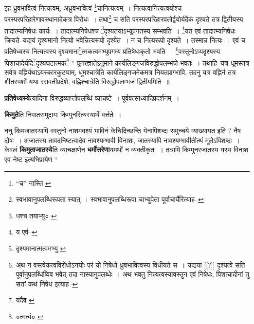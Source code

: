 \documentclass[article,12pt,a4paper]{memoir}
\begin{document}
	इह ध्रुवभावित्वं नित्यत्वम्, अध्रुवभावित्वं \footnote{“च” नास्ति \cite{dp-msB} \cite{dp-msD}}\-चानित्यत्वम् । नित्यत्वानित्यत्वयोश्च परस्परपरिहारेणावस्थानादेकत्र विरोधः । तथा\footnote{स्वभावानुपलब्धिरूपता स्यात् । स्वभावानुपलब्धिरूपा चाभ्युपेता पूर्वाचार्यैरित्याह--\cite{dp-msD-n}} च सति परस्परपरिहारवतोर्द्वयोर्यदैकं दृश्यते तत्र द्वितीयस्य तादात्म्यनिषेधः कार्यः । तादात्म्यनिषेधश्च \footnote{धश्च तयाभ्यु० \cite{dp-msA}}\-दृश्यतयाऽभ्युपगतस्य सम्भवति । \footnote{य एवं--\cite{dp-msA}}\-यत एवं तादात्म्यनिषेधः क्रियते--यद्ययं दृश्यमानो नित्यो भवेन्नित्यरूपो दृश्येत । न च नित्यरूपो दृश्यते । तस्मान्न नित्यः । एवं च प्रतिषेध्यस्य नित्यत्वस्य दृश्यमाना\footnote{दृश्यमानात्मत्वमभ्यु \cite{dp-msA} \cite{dp-edP} \cite{dp-edH} \cite{dp-edE} \cite{dp-edN}}त्मकत्वमभ्युपगम्य प्रतिषेधःकृतो भवति । \footnote{अथ न वस्त्वेकत्वविरोधोऽनयोः परं यो निषेधो ध्रुवभावित्वस्य विधीयते स । यद्यया [[?]] दृश्यत्वे सति पूर्वानुपलब्धिष्विव भवेत् तदा नास्यानुपलब्धेः । अथ भवतु नित्यत्वस्यावस्तुन एवं निषेधः, पिशाचादीनां तु सतां कथं निषेध इत्याह--\cite{dp-msD-n}}\-वस्तुनोऽप्यदृश्यस्य पिशाचादेर्यदि\footnote{यदैव \cite{dp-msB}}\-दृश्यघटात्मक\footnote{०त्मत्वं० \cite{dp-msA} \cite{dp-edP} \cite{dp-edH} \cite{dp-edE} \cite{dp-edN}}\--” पुनरज्ञातेऽनुमाने कार्यलिङ्गजविरुद्धोपलम्भजे भवतः । तथाहि--यत्र धूमस्तत्र सर्वत्र वह्निर्यथाऽयस्कारकुट्याम्, धूमश्चात्रेति कार्यलिङ्गजमेकमत्र नियतप्राग्भावि, तदनु यत्र वह्निर्न तत्र शीतस्पर्शो यथा रसवतीप्रदेशे, वह्निश्चात्रेति विरुद्धोपलम्भजं द्वितीयमिति ॥
	\pend
      

	  \pstart \textbf{प्रतिषेध्यस्ये}त्यादिना विरुद्धव्याप्तोपलब्धिं\leavevmode{} व्याचष्टे । पूर्ववत्साध्यादिप्रदर्शनम् ।
	\pend
      

	  \pstart \textbf{किमुते}ति निपातसमुदायः किम्पुनरित्यस्यार्थे वर्त्तते ।
	\pend
      

	  \pstart ननु किमजातस्यापि वस्तुनो नाशमवश्यं भाविनं केचिदिच्छन्ति येनापिशब्दः समुच्चये व्याख्यायत इति ? नैष दोषः । अजातस्य तावदनिष्टत्वादेव नावश्यम्भावी विनाशः, जातस्यापि नावश्यम्भावीतीत्थं मूलेऽपिशब्दः । केवलं \textbf{किमुताजातस्ये}ति व्याचक्षाणेन \textbf{धर्मोत्तरेणा}यमर्थो न व्यक्तीकृतः । तत्रापि किम्पुनरजातस्य यस्य विनाश एव नेष्ट इत्यभिप्रायेण  \leavevmode{} “
	  
\end{document}

